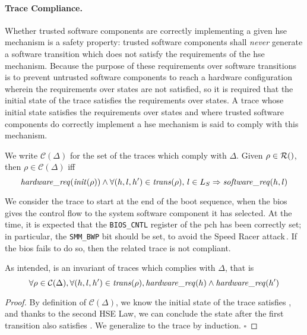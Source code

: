\paragraph{Trace Compliance.}
%
Whether trusted software components are correctly implementing a given \ac{hse}
mechanism is a safety property: trusted software components shall \emph{never}
generate a software transition which does not satisfy the requirements of the
\ac{hse} mechanism.
%
Because the purpose of these requirements over software transitions is to
prevent untrusted software components to reach a hardware configuration wherein
the requirements over states are not satisfied, so it is required that the
initial state of the trace satisfies the requirements over states.
%
A trace whose initial state satisfies the requirements over states and where
trusted software components do correctly implement a \ac{hse} mechanism is said
to comply with this mechanism.

\begin{definition}
  We write $\mathcal{C}(\Delta)$ for the set of the traces which comply with
  $\Delta$.
  Given $\rho \in \pathesLTS{Ez}$, then $\rho \in \mathcal{C}(\Delta)$ iff
  \[
    \mathit{hardware\_req}(\mathit{init}(\rho)) \wedge \forall (h,l,h') \in
    \mathit{trans}(\rho)\text{, }l \in L_S \Rightarrow \mathit{software\_req}(h, l)
  \]
\end{definition}

\begin{example}
  We consider the trace to start at the end of the boot sequence, when the
  \ac{bios} gives the control flow to the system software component it has
  selected.
  At the time, it is expected that the \texttt{BIOS\_CNTL} register of the
  \ac{pch} has been correctly set; in particular, the \texttt{SMM\_BWP} bit
  should be set, to avoid the Speed Racer
  attack\,\cite{kallenberg2015racecondition}.
  If the \ac{bios} fails to do so, then the related trace is not compliant.
\end{example}

\begin{lemma}
  \label{lemma:speccert:hseinv}
  As intended,  is an invariant of traces which complies
  with $\Delta$, that is
  \[
    \forall \rho \in \mathcal{C}(\Delta), \forall (h, l, h') \in
    \mathit{trans}(\rho), \mathit{hardware\_req}(h) \wedge \mathit{hardware\_req}(h')
  \]

  \begin{proof}
    By definition of $\mathcal{C}(\Delta)$, we know the initial state of the
    trace satisfies , and thanks to the second HSE Law, we
    can conclude the state after the first transition also satisfies
    .
    We generalize to the trace by induction.
    \hfill \( \square \)
  \end{proof}
\end{lemma}

